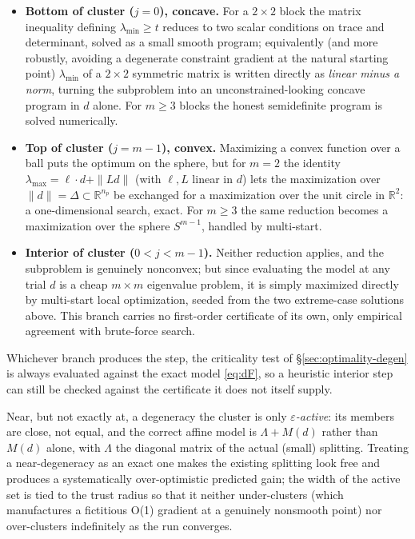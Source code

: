 \documentclass[11pt]{article}
\newcommand{\lammin}{\lambda_{\min}}
\newcommand{\lammax}{\lambda_{\max}}
\newcommand{\R}{\mathbb{R}}
\theoremstyle{plain}
\begin{document}
\begin{itemize}
\item \textbf{Bottom of cluster ($j=0$), concave.} For a $2\times2$ block the matrix inequality
  defining $\lammin\ge t$ reduces to two scalar conditions on trace and determinant, solved as a
  small smooth program; equivalently (and more robustly, avoiding a degenerate constraint gradient
  at the natural starting point) $\lammin$ of a $2\times2$ symmetric matrix is written directly as
  \emph{linear minus a norm}, turning the subproblem into an unconstrained-looking concave program
  in $d$ alone. For $m\ge3$ blocks the honest semidefinite program is solved numerically.
\item \textbf{Top of cluster ($j=m-1$), convex.} Maximizing a convex function over a ball puts the
  optimum on the sphere, but for $m=2$ the identity
  $\lammax=\ell\cdot d+\|Ld\|$ (with $\ell,L$ linear in $d$) lets the maximization over
  $\|d\|=\Delta\subset\R^{n_p}$ be exchanged for a maximization over the unit circle in $\R^2$: a
  one-dimensional search, exact. For $m\ge3$ the same reduction becomes a maximization over the
  sphere $S^{m-1}$, handled by multi-start.
\item \textbf{Interior of cluster ($0<j<m-1$).} Neither reduction applies, and the subproblem is
  genuinely nonconvex; but since evaluating the model at any trial $d$ is a cheap $m\times m$
  eigenvalue problem, it is simply maximized directly by multi-start local optimization, seeded
  from the two extreme-case solutions above. This branch carries no first-order certificate of its
  own, only empirical agreement with brute-force search.
\end{itemize}

\noindent Whichever branch produces the step, the criticality test of \S\ref{sec:optimality-degen}
is always evaluated against the exact model \eqref{eq:dF}, so a heuristic interior step can still
be checked against the certificate it does not itself supply.

Near, but not exactly at, a degeneracy the cluster is only \emph{$\varepsilon$-active}: its
members are close, not equal, and the correct affine model is $\Lambda+M(d)$ rather than $M(d)$
alone, with $\Lambda$ the diagonal matrix of the actual (small) splitting. Treating a near-degeneracy
as an exact one makes the existing splitting look free and produces a systematically over-optimistic
predicted gain; the width of the active set is tied to the trust radius so that it neither
under-clusters (which manufactures a fictitious O(1) gradient at a genuinely nonsmooth point) nor
over-clusters indefinitely as the run converges.
\end{document}
